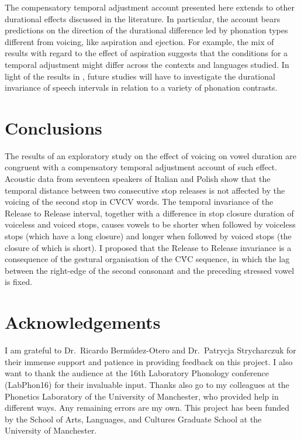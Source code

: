 \documentclass[12pt,]{article}
\begin{document}
The compensatory temporal adjustment account presented here extends to
other durational effects discussed in the literature. In particular, the
account bears predictions on the direction of the durational difference
led by phonation types different from voicing, like aspiration and
ejection. For example, the mix of results with regard to the effect of
aspiration \citep{durvasula2012} suggests that the conditions for a
temporal adjustment might differ across the contexts and languages
studied. In light of the results in \citet{begus2017}, future studies
will have to investigate the durational invariance of speech intervals
in relation to a variety of phonation contrasts.

\hypertarget{conclusions}{%
\section{Conclusions}\label{conclusions}}

The results of an exploratory study on the effect of voicing on vowel
duration are congruent with a compensatory temporal adjustment account
of such effect. Acoustic data from seventeen speakers of Italian and
Polish show that the temporal distance between two consecutive stop
releases is not affected by the voicing of the second stop in CV́CV
words. The temporal invariance of the Release to Release interval,
together with a difference in stop closure duration of voiceless and
voiced stops, causes vowels to be shorter when followed by voiceless
stops (which have a long closure) and longer when followed by voiced
stops (the closure of which is short). I proposed that the Release to
Release invariance is a consequence of the gestural organisation of the
CV́C sequence, in which the lag between the right-edge of the second
consonant and the preceding stressed vowel is fixed.

\hypertarget{acknowledgements}{%
\section{Acknowledgements}\label{acknowledgements}}

I am grateful to Dr.~Ricardo Bermúdez-Otero and Dr.~Patrycja
Strycharczuk for their immense support and patience in providing
feedback on this project. I also want to thank the audience at the 16th
Laboratory Phonology conference (LabPhon16) for their invaluable input.
Thanks also go to my colleagues at the Phonetics Laboratory of the
University of Manchester, who provided help in different ways. Any
remaining errors are my own. This project has been funded by the School
of Arts, Languages, and Cultures Graduate School at the University of
Manchester.
\end{document}
